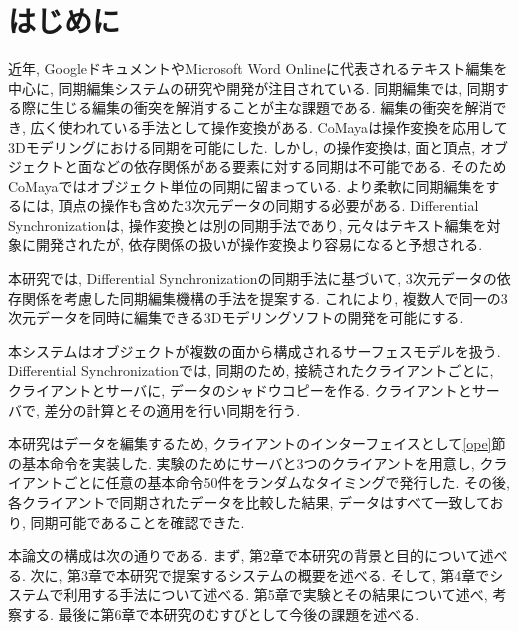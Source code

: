 \chapter{はじめに}
近年, Googleドキュメント\cite{GOOGLEDOCS}やMicrosoft Word Online\cite{WORDONLINE}に代表されるテキスト編集を中心に, 同期編集システムの研究や開発が注目されている.
同期編集では, 同期する際に生じる編集の衝突を解消することが主な課題である.
編集の衝突を解消でき, 広く使われている手法として操作変換がある.
CoMaya\cite{COMAYA}は操作変換を応用して3Dモデリングにおける同期を可能にした.
しかし, \cite{COMAYA}の操作変換は, 面と頂点, オブジェクトと面などの依存関係がある要素に対する同期は不可能である.
そのためCoMayaではオブジェクト単位の同期に留まっている.
より柔軟に同期編集をするには, 頂点の操作も含めた3次元データの同期する必要がある.
Differential Synchronization\cite{DS}は, 操作変換とは別の同期手法であり, 元々はテキスト編集を対象に開発されたが, 依存関係の扱いが操作変換より容易になると予想される.
\par
本研究では, Differential Synchronizationの同期手法に基づいて, 3次元データの依存関係を考慮した同期編集機構の手法を提案する.
これにより, 複数人で同一の3次元データを同時に編集できる3Dモデリングソフトの開発を可能にする.
\par
本システムはオブジェクトが複数の面から構成されるサーフェスモデルを扱う. Differential Synchronizationでは, 同期のため, 接続されたクライアントごとに, クライアントとサーバに, データのシャドウコピーを作る. クライアントとサーバで, 差分の計算とその適用を行い同期を行う.
\par
本研究はデータを編集するため, クライアントのインターフェイスとして\ref{ope}節の基本命令を実装した.
実験のためにサーバと3つのクライアントを用意し, クライアントごとに任意の基本命令50件をランダムなタイミングで発行した.
 その後, 各クライアントで同期されたデータを比較した結果, データはすべて一致しており, 同期可能であることを確認できた.
\par
本論文の構成は次の通りである. まず, 第2章で本研究の背景と目的について述べる. 次に, 第3章で本研究で提案するシステムの概要を述べる. そして, 第4章でシステムで利用する手法について述べる. 第5章で実験とその結果について述べ, 考察する. 最後に第6章で本研究のむすびとして今後の課題を述べる.
